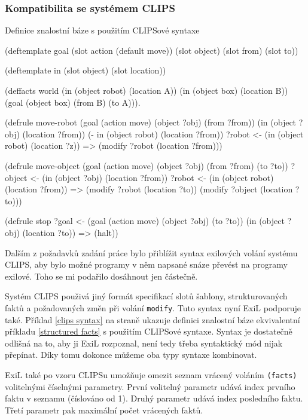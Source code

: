 \subsubsection{Kompatibilita se systémem CLIPS}

\begin{listing}[t]
\caption{Definice znalostní báze s použitím CLIPSové syntaxe}
\label{clips syntax}
\begin{clcode}
(deftemplate goal
  (slot action (default move))
  (slot object)
  (slot from)
  (slot to))

(deftemplate in
  (slot object)
  (slot location))

(deffacts world
  (in (object robot) (location A))
  (in (object box) (location B))
  (goal (object box) (from B) (to A))).

(defrule move-robot
  (goal (action move) (object ?obj) (from ?from))
  (in (object ?obj) (location ?from))
  (- in (object robot) (location ?from))
  ?robot <- (in (object robot) (location ?z))
  =>
  (modify ?robot (location ?from)))

(defrule move-object
  (goal (action move) (object ?obj) (from ?from) (to ?to))
  ?object <- (in (object ?obj) (location ?from))
  ?robot <- (in (object robot) (location ?from))
  =>
  (modify ?robot (location ?to))
  (modify ?object (location ?to)))

(defrule stop
  ?goal <- (goal (action move) (object ?obj) (to ?to))
  (in (object ?obj) (location ?to))
  =>
  (halt))
\end{clcode}
\end{listing}

Dalším z požadavků zadání práce bylo přiblížit syntax exilových volání systému
CLIPS, aby bylo možné programy v něm napsané snáze převést na programy exilové.
Toho se mi podařilo dosáhnout jen částečně.

\FloatBarrier

Systém CLIPS použivá jiný formát specifikací slotů šablony, strukturovaných
faktů a požadovaných změn při volání \verb|modify|. Tuto syntax nyní ExiL podporuje
také. Příklad \ref{clips syntax} na straně \pageref{clips syntax} ukazuje
definici znalostní báze ekvivalentní příkladu \ref{structured facts} s použitím
CLIPSové syntaxe. Syntax je dostatečně odlišná na to, aby ji ExiL rozpoznal,
není tedy třeba syntaktický mód nijak přepínat. Díky tomu dokonce můžeme oba
typy syntaxe kombinovat.

ExiL také po vzoru CLIPSu umožňuje omezit seznam vrácený voláním \verb|(facts)|
volitelnými číselnými parametry. První volitelný parametr udává index prvního
faktu v seznamu (číslováno od 1). Druhý parametr udává index posledního faktu.
Třetí parametr pak maximální počet vrácených faktů.

